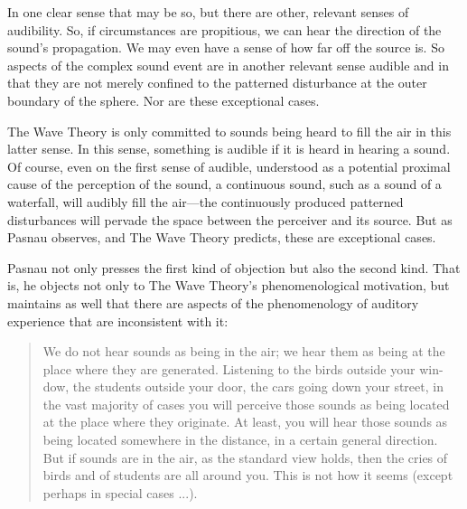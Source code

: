 \documentclass[12pt]{article}
\begin{document}
In one clear sense that may be so, but there are other, relevant senses of audibility. So, if circumstances are propitious, we can hear the direction of the sound's propagation. We may even have a sense of how far off the source is. So aspects of the complex sound event are in another relevant sense audible and in that they are not merely confined to the patterned disturbance at the outer boundary of the sphere. Nor are these exceptional cases. 

The Wave Theory is only committed to sounds being heard to fill the air in this latter sense. In this sense, something is audible if it is heard in hearing a sound. Of course, even on the first sense of audible, understood as a potential proximal cause of the perception of the sound, a continuous sound, such as a sound of a waterfall, will audibly fill the air---the continuously produced patterned disturbances will pervade the space between the perceiver and its source. But as Pasnau observes, and The Wave Theory predicts, these are exceptional cases.

Pasnau not only presses the first kind of objection but also the second kind. That is, he objects not only to The Wave Theory’s phenomenological motivation, but maintains as well that there are aspects of the phenomenology of auditory experience that are inconsistent with it:
\begin{quote}
	We do not hear sounds as being in the air; we hear them as being at the place where they are generated. Listening to the birds outside your win- dow, the students outside your door, the cars going down your street, in the vast majority of cases you will perceive those sounds as being located at the place where they originate. At least, you will hear those sounds as being located somewhere in the distance, in a certain general direction. But if sounds are in the air, as the standard view holds, then the cries of birds and of students are all around you. This is not how it seems (except perhaps in special cases ...). 
\end{quote}
\end{document}
